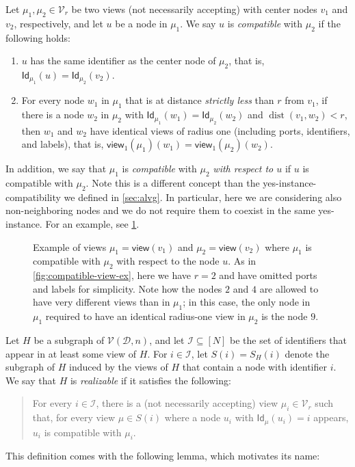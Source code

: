 \documentclass[11pt]{article}
\DeclareMathOperator{\dist}{dist}
\newcommand*{\alvgd}{\mathcal{V}(\mathcal{D},n)}
\newcommand*{\ids}{\mathsf{Id}}
\newcommand*{\view}{\mathsf{view}}
\begin{document}
Let $\mu_1, \mu_2 \in \mathcal{V}_r$ be two views (not necessarily accepting)
with center nodes $v_1$ and $v_2$, respectively, and let $u$ be a node in
$\mu_1$.
We say $u$ is \emph{compatible} with $\mu_2$ if the following holds:
\begin{enumerate}
  \item $u$ has the same identifier as the center node of $\mu_2$, that is,
  $\ids_{\mu_1}(u) = \ids_{\mu_2}(v_2)$.
  \item For every node $w_1$ in $\mu_1$ that is at distance \emph{strictly less}
  than $r$ from $v_1$, if there is a node $w_2$ in $\mu_2$ with
  $\ids_{\mu_1}(w_1) = \ids_{\mu_2}(w_2)$ and $\dist(v_1,w_2) < r$, then $w_1$
  and $w_2$ have identical views of radius one (including ports, identifiers,
  and labels), that is, $\view_1(\mu_1)(w_1) = \view_1(\mu_2)(w_2)$.
\end{enumerate}
In addition, we say that $\mu_1$ is \emph{compatible} with $\mu_2$ \emph{with
respect to $u$} if $u$ is compatible with $\mu_2$.
Note this is a different concept than the yes-instance-compatibility we defined
in \cref{sec:alvg}.
In particular, here we are considering also non-neighboring nodes and we do not
require them to coexist in the same yes-instance.
For an example, see \cref{fig:compatible-node-ex}.

\begin{figure}
  \centering
  
  \caption{Example of views $\mu_1 = \view(v_1)$ and $\mu_2 = \view(v_2)$ where
    $\mu_1$ is compatible with $\mu_2$ with respect to the node $u$.
    As in \cref{fig:compatible-view-ex}, here we have $r = 2$ and have omitted
    ports and labels for simplicity.
    Note how the nodes $2$ and $4$ are allowed to have very different views than
    in $\mu_1$; in this case, the only node in $\mu_1$ required to have an
    identical radius-one view in $\mu_2$ is the node $9$.
  }
  \label{fig:compatible-node-ex}
\end{figure}

Let $H$ be a subgraph of $\alvgd$, and let $\mathcal{I} \subseteq [N]$ be the
set of identifiers that appear in at least some view of $H$.
For $i \in \mathcal{I}$, let $S(i) = S_H(i)$ denote the subgraph of $H$ induced
by the views of $H$ that contain a node with identifier $i$.
We say that $H$ is \emph{realizable} if it satisfies the following:
\begin{quote}
  For every $i \in \mathcal{I}$, there is a (not necessarily accepting) view
  $\mu_i \in \mathcal{V}_r$ such that, for every view $\mu \in S(i)$ where a
  node $u_i$ with $\ids_\mu(u_i) = i$ appears, $u_i$ is compatible with $\mu_i$.
\end{quote}
This definition comes with the following lemma, which motivates its name:
\end{document}
